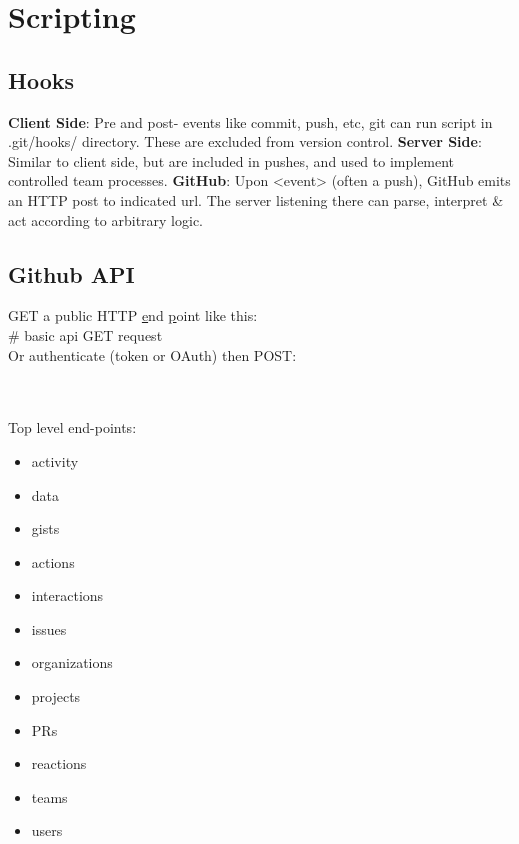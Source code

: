 \section{Scripting}

\subsection*{Hooks}
{\footnotesize 
\textbf{Client Side}: Pre and post- events like commit, push, etc, git can run script in .git/hooks/ directory.  These are excluded from version control. \textbf{Server Side}: Similar to client side, but are included in pushes, and used to implement controlled team processes.
\textbf{GitHub}: Upon <event> (often a push), GitHub emits an HTTP post to indicated url.  The server listening there can parse, interpret \& act according to arbitrary logic. 
}

\subsection*{Github API}
GET a public HTTP \underline{e}nd \underline{p}oint like this:\\
 \# basic api GET request \\
Or authenticate (token or OAuth) then POST: \\
\\
\phantom{xxxx} \\
\phantom{xxxx}  

Top level end-points:
\begin{multicols}{2}
\scriptsize
\begin{itemize}
    \item activity
    \item data
    \item gists
    \item actions
    \item interactions
    \item issues
    \item organizations
    \item projects
    \item PRs
    \item reactions
    \item teams
    \item users
\end{itemize}
\end{multicols}
\ \\